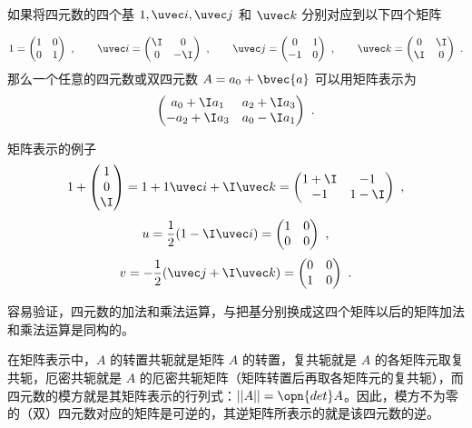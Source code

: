 如果将四元数的四个基 $1, \uvec i, \uvec j$ 和 $\uvec k$ 分别对应到以下四个矩阵

\begin{equation}
1=\begin{pmatrix}1&0\\0&1\end{pmatrix} ~,
\qquad
\uvec i=\begin{pmatrix}\I&0\\0&-\I\end{pmatrix}~,
\qquad
\uvec j=\begin{pmatrix}0&1\\-1&0\end{pmatrix}~,
\qquad
\uvec k=\begin{pmatrix}0&\I\\\I&0\end{pmatrix} ~.
\end{equation}
那么一个任意的四元数或双四元数 $A=a_0+\bvec{a}$ 可以用矩阵表示为
\begin{equation}
\begin{pmatrix}a_0+\I a_1&a_2+\I a_3\\-a_2+\I a_3&a_0-\I a_1 \end{pmatrix} ~.
\end{equation}

\begin{example}{矩阵表示的例子}\label{ex_Quat_1}
\begin{equation}
1+\begin{pmatrix}1\\0\\\I\end{pmatrix} =1+1\uvec i+\I\uvec k =\begin{pmatrix}1+\I&-1\\-1&1-\I\end{pmatrix} ~,
\end{equation}
\begin{equation}
u=\frac{1}{2}(1-\I\uvec i)=\begin{pmatrix}1&0\\0&0\end{pmatrix} ~,
\end{equation}
\begin{equation}
v=-\frac{1}{2}(\uvec j+\I\uvec k)=\begin{pmatrix}0&0\\1&0\end{pmatrix} ~.
\end{equation}
\end{example}

容易验证，四元数的加法和乘法运算，与把基分别换成这四个矩阵以后的矩阵加法和乘法运算是同构的。

在矩阵表示中，$A$ 的转置共轭就是矩阵 $A$ 的转置，复共轭就是 $A$ 的各矩阵元取复共轭，厄密共轭就是 $A$ 的厄密共轭矩阵（矩阵转置后再取各矩阵元的复共轭），而四元数的模方就是其矩阵表示的行列式：$||A||=\opn{det}A$。因此，模方不为零的（双）四元数对应的矩阵是可逆的，其逆矩阵所表示的就是该四元数的逆。
